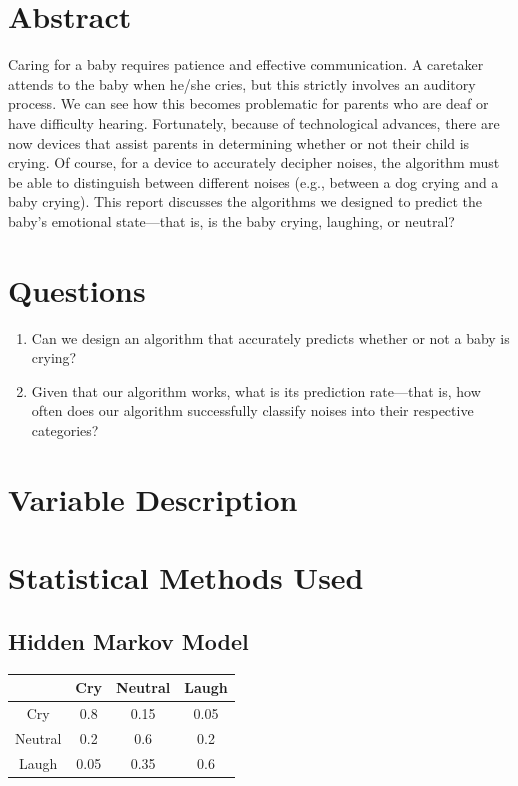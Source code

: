 \documentclass[paper=a4, fontsize=11pt]{scrartcl}
\numberwithin{equation}{section}
\numberwithin{figure}{section}
\numberwithin{table}{section}
\begin{document}
\section{Abstract}
%
% 
%
Caring for a baby requires patience and effective communication. A caretaker attends to the baby when he/she cries, but this strictly involves an auditory process. We can see how this becomes problematic for parents who are deaf or have difficulty hearing. Fortunately, because of technological advances, there are now devices that assist parents in determining whether or not their child is crying. Of course, for a device to accurately decipher noises, the algorithm must be able to distinguish between different noises (e.g., between a dog crying and a baby crying). This report discusses the algorithms we designed to predict the baby's emotional state---that is, is the baby crying, laughing, or neutral? 


\section{Questions}
\begin{enumerate}
	\item Can we design an algorithm that accurately predicts whether or not a baby is crying?
	\item Given that our algorithm works, what is its prediction rate---that is, how often does our algorithm successfully classify noises into their respective categories?
\end{enumerate}

\section{Variable Description}

\section{Statistical Methods Used}
\subsection{Hidden Markov Model}
\begin{center}
\begin{tabular}{ |c|c|c|c| } 
 \hline
       & Cry & Neutral & Laugh \\
 \hline
 Cry & 0.8 & 0.15 & 0.05 \\ 
 Neutral & 0.2 & 0.6 & 0.2 \\ 
 Laugh & 0.05 & 0.35 & 0.6 \\
 \hline
\end{tabular}
\end{center}
\end{document}
